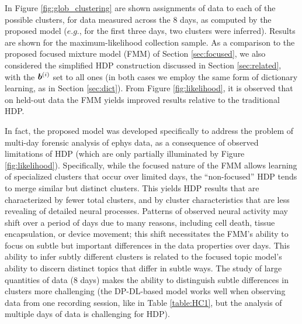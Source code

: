 \documentclass[journal]{IEEEtran}
\begin{document}
In Figure \ref{fig:glob_clustering} are shown assignments of data to each of the possible clusters, for data measured across the 8 days, as computed by the proposed model ($e.g.$, for the first three days, two clusters were inferred). Results are shown for the maximum-likelihood collection sample. As a comparison to the proposed focused mixture model (FMM) of Section \ref{sec:focused}, we also considered the simplified HDP construction discussed in Section \ref{sec:related}, with the $\boldsymbol{b}^{(i)}$ set to all ones (in both cases we employ the same form of dictionary learning, as in Section \ref{sec:dict}). From Figure \ref{fig:likelihood}, it is observed that on held-out data the FMM yields improved results relative to the traditional HDP.

In fact, the proposed model was developed specifically to address the problem of multi-day forensic analysis of ephys data, as a consequence of observed limitations of HDP (which are only partially illuminated by Figure \ref{fig:likelihood}). Specifically, while the focused nature of the FMM allows learning of specialized clusters that occur over limited days, the ``non-focused'' HDP tends to merge similar but distinct clusters. This yields HDP results that are characterized by fewer total clusters, and by cluster characteristics that are less revealing of detailed neural processes. Patterns of observed neural activity may shift over a period of days due to many reasons, including cell death, tissue encapsulation, or device movement; this shift necessitates the FMM's ability to focus on subtle but important differences in the data properties over days. This ability to infer subtly different clusters is related to the focused topic model's ability  \cite{compound} to discern distinct topics that differ in subtle ways. The study of large quantities of data (8 days) makes the ability to distinguish subtle differences in clusters more challenging (the DP-DL-based model works well when observing data from one recording session, like in Table \ref{table:HC1}, but the analysis of multiple days of data is challenging for HDP).



%
\end{document}
